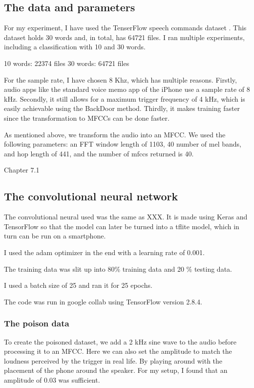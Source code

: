 \documentclass{article}
\theoremstyle{definition}
\theoremstyle{remark}
\begin{document}
\subsection{The data and parameters}
For my experiment, I have used the TenserFlow speech commands dataset \cite{Speech_commands}. This dataset holds 30 words and, in total, has 64721 files. I ran multiple experiments, including a classification with 10 and 30 words.

10 words: 22374 files
30 words: 64721 files

For the sample rate, I have chosen 8 Khz, which has multiple reasons. Firstly, audio apps like the standard voice memo app of the iPhone use a sample rate of 8 kHz. Secondly, it still allows for a maximum trigger frequency of 4 kHz, which is easily achievable using the BackDoor method. Thirdly, it makes training faster since the transformation to MFCCs can be done faster. 

As mentioned above, we transform the audio into an MFCC. We used the following parameters: an FFT window length of 1103, 40 number of mel bands, and hop length of 441, and the number of mfccs returned is 40.

Chapter 7.1 \cite{SpokenLanguageProcessing} \cite{9054750} \cite{Liu2018TrojaningAO}
\subsection{The convolutional neural network}
The convolutional neural used was the same as XXX. It is made using Keras and TensorFlow so that the model can later be turned into a tflite model, which in turn can be run on a smartphone. 

I used the adam optimizer in the end with a learning rate of 0.001.

The training data was slit up into 80\% training data and 20 \% testing data.

I used a batch size of 25 and ran it for 25 epochs. 

The code was run in google collab using TensorFlow version 2.8.4.

\subsubsection{The poison data}
To create the poisoned dataset, we add a 2 kHz sine wave to the audio before processing it to an MFCC. Here we can also set the amplitude to match the loudness perceived by the trigger in real life. By playing around with the placement of the phone around the speaker. For my setup, I found  that an amplitude of 0.03 was sufficient. 
\end{document}
